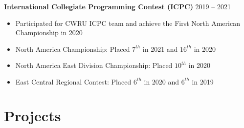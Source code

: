 \documentclass[11pt]{article}
\begin{document}
\hspace{10pt}\textbf{International Collegiate Programming Contest (ICPC)} \hfill {\small 2019 -- 2021}
\begin{itemize}[leftmargin=31pt]
\vspace{-10pt}
\setlength\itemsep{-5pt}
    \item {\small Participated for CWRU ICPC team and achieve the First North American Championship in 2020}
    \item {\small North America Championship: Placed $7^{th}$ in 2021 and $16^{th}$ in 2020}
    \item {\small North America East Division Championship: Placed $10^{th}$ in 2020}
    \item {\small East Central Regional Contest: Placed $6^{th}$ in 2020 and $6^{th}$ in 2019}
    \vspace{-7pt}
\end{itemize}

\section{Projects}


\end{document}
